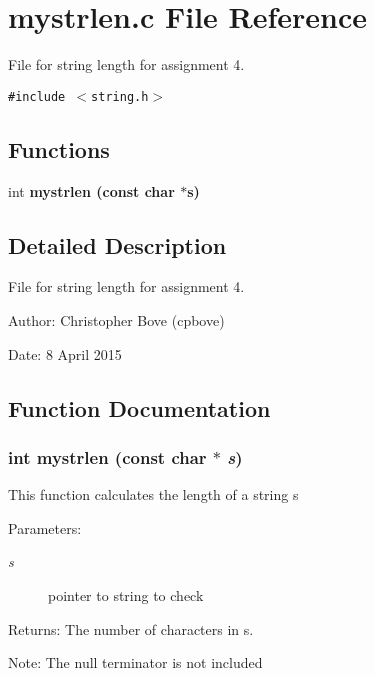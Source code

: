 \section{mystrlen.c File Reference}
\label{mystrlen_8c}
File for string length for assignment 4. 

{\tt \#include $<$string.h$>$}\par
\subsection*{Functions}
\begin{CompactItemize}
\item 
int \bf{mystrlen} (const char $\ast$s)
\end{CompactItemize}


\subsection{Detailed Description}
File for string length for assignment 4. 

\begin{Desc}
\item[Author:]Christopher Bove (cpbove) \end{Desc}
\begin{Desc}
\item[Date:]8 April 2015 \end{Desc}


\subsection{Function Documentation}
\subsubsection{\setlength{\rightskip}{0pt plus 5cm}int mystrlen (const char $\ast$ {\em s})}\label{mystrlen_8c_cdaeaf9a3518fd8974119c6415075e3f}


This function calculates the length of a string s \begin{Desc}
\item[Parameters:]
\begin{description}
\item[{\em s}]pointer to string to check \end{description}
\end{Desc}
\begin{Desc}
\item[Returns:]The number of characters in s. \end{Desc}
\begin{Desc}
\item[Note:]The null terminator is not included \end{Desc}
